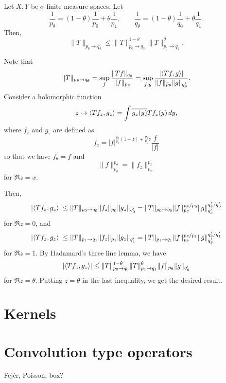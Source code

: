 \documentclass{../../large}
\begin{document}
\begin{prb}
Let $X,Y$ be $\sigma$-finite measure spaces.
Let
\[\frac1{p_\theta}=(1-\theta)\frac1{p_0}+\theta\frac1{p_1},\qquad\frac1{q_\theta}=(1-\theta)\frac1{q_0}+\theta\frac1{q_1}.\]
Then,
\[\|T\|_{p_\theta\to q_\theta}\le\|T\|_{p_0\to q_0}^{1-\theta}\|T\|_{p_1\to q_1}^\theta.\]
\end{prb}
\begin{pf}
Note that
\[\|T\|_{p_\theta\to q_\theta}=\sup_f\frac{\|Tf\|_{q_\theta}}{\|f\|_{p_\theta}}=\sup_{f,g}\frac{|\langle Tf,g\rangle|}{\|f\|_{p_\theta}\|g\|_{q'_\theta}}.\]
Consider a holomorphic function
\[z\mapsto\langle Tf_z,g_z\rangle=\int\overline{g_z(y)}Tf_z(y)\,dy,\]
where $f_z$ and $g_z$ are defined as
\[f_z=|f|^{\frac{p_\theta}{p_0}(1-z)+\frac{p_\theta}{p_1}z}\frac f{|f|}\]
so that we have $f_\theta=f$ and
\[\|f\|_{p_\theta}^{p_\theta}=\|f_z\|_{p_x}^{p_x}\]
for $\Re z=x$.

Then,
\[|\langle Tf_z,g_z\rangle|\le\|T\|_{p_0\to q_0}\|f_z\|_{p_0}\|g_z\|_{q'_0}=\|T\|_{p_0\to q_0}\|f\|_{p_\theta}^{p_\theta/p_0}\|g\|_{q'_\theta}^{q'_\theta/q'_0}\]
for $\Re z=0$, and
\[|\langle Tf_z,g_z\rangle|\le\|T\|_{p_1\to q_1}\|f_z\|_{p_1}\|g_z\|_{q'_1}=\|T\|_{p_1\to q_1}\|f\|_{p_\theta}^{p_\theta/p_1}\|g\|_{q'_\theta}^{q'_\theta/q'_1}\]
for $\Re z=1$.
By Hadamard's three line lemma, we have
\[|\langle Tf_z,g_z\rangle|\le\|T\|_{p_0\to q_0}^{1-\theta}\|T\|_{p_1\to q_1}^\theta\|f\|_{p_\theta}\|g\|_{q'_\theta}\]
for $\Re z=\theta$.
Putting $z=\theta$ in the last inequality, we get the desired result.
\end{pf}




\section{Kernels}
\begin{prb}
\end{prb}
\begin{prb}
\end{prb}

\section{Convolution type operators}
\begin{prb}
Fej\'er, Poisson, box?
\end{prb}
\begin{prb}
\end{prb}
\end{document}
